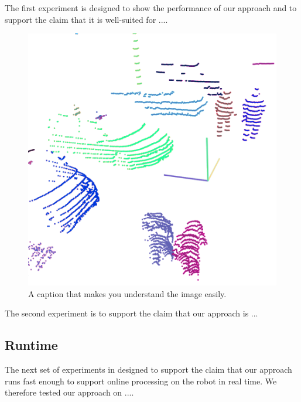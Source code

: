 \documentclass[letterpaper, 10 pt, conference]{ieeeconf}  %
\begin{document}
The first experiment is designed to show the performance of our
approach and to support the claim that it is well-suited for ....

\begin{figure}[t]
  \centering
 \includegraphics[width=0.99\columnwidth]{pics/motivation}
  \caption{A caption that makes you understand the image easily.}
  \label{fig:parameval}
\end{figure}

The second experiment is to support the claim that our approach is ...

\subsection{Runtime}

The next set of experiments in designed to support the claim that our
approach runs fast enough to support online processing on the robot in
real time. We therefore tested our approach on ....
\end{document}
